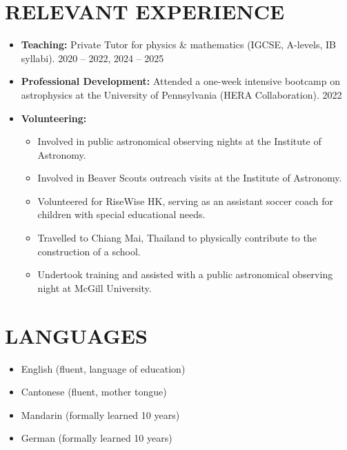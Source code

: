 \documentclass[a4paper,10pt]{extarticle}
\begin{document}
\section*{RELEVANT EXPERIENCE}
\begin{itemize}
    \item \textbf{Teaching:} Private Tutor for physics & mathematics (IGCSE, A-levels, IB syllabi). \hfill 2020 – 2022, 2024 – 2025
    \item \textbf{Professional Development:} Attended a one-week intensive bootcamp on astrophysics at the University of Pennsylvania (HERA Collaboration). \hfill 2022
    \item \textbf{Volunteering:}
    \begin{itemize}
        \item Involved in public astronomical observing nights at the Institute of Astronomy.
        \item Involved in Beaver Scouts outreach visits at the Institute of Astronomy.
        \item Volunteered for RiseWise HK, serving as an assistant soccer coach for children with special educational needs.
        \item Travelled to Chiang Mai, Thailand to physically contribute to the construction of a school.
        \item Undertook training and assisted with a public astronomical observing night at McGill University.
    \end{itemize}
\end{itemize}


\section*{LANGUAGES}
\begin{itemize}
    \item English (fluent, language of education)

    \item Cantonese (fluent, mother tongue)

    \item Mandarin (formally learned 10 years)

    \item German (formally learned 10 years)
\end{itemize}

\end{document}
